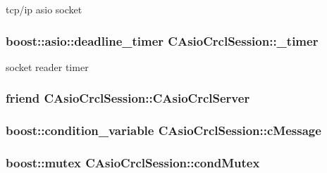tcp/ip asio socket \hypertarget{classCAsioCrclSession_a98a3308f0d6e8dd4c24d85fcc11ce87d}{
\subsubsection[{\-\_\-timer}]{\setlength{\rightskip}{0pt plus 5cm}boost\-::asio\-::deadline\-\_\-timer C\-Asio\-Crcl\-Session\-::\-\_\-timer\hspace{0.3cm}{\ttfamily [protected]}}}\label{classCAsioCrclSession_a98a3308f0d6e8dd4c24d85fcc11ce87d}
socket reader timer \hypertarget{classCAsioCrclSession_a9e3323a53591358adfce25ddf9ae580f}{
\subsubsection[{C\-Asio\-Crcl\-Server}]{\setlength{\rightskip}{0pt plus 5cm}friend C\-Asio\-Crcl\-Session\-::\-C\-Asio\-Crcl\-Server\hspace{0.3cm}{\ttfamily [protected]}}}\label{classCAsioCrclSession_a9e3323a53591358adfce25ddf9ae580f}
\hypertarget{classCAsioCrclSession_ac3008f28bb46669c7c4693dc49c9c183}{
\subsubsection[{c\-Message}]{\setlength{\rightskip}{0pt plus 5cm}boost\-::condition\-\_\-variable C\-Asio\-Crcl\-Session\-::c\-Message\hspace{0.3cm}{\ttfamily [protected]}}}\label{classCAsioCrclSession_ac3008f28bb46669c7c4693dc49c9c183}
\hypertarget{classCAsioCrclSession_a6c8fdf25cfe9645eb0e3d0b9e56c6e07}{
\subsubsection[{cond\-Mutex}]{\setlength{\rightskip}{0pt plus 5cm}boost\-::mutex C\-Asio\-Crcl\-Session\-::cond\-Mutex\hspace{0.3cm}{\ttfamily [protected]}}}\label{classCAsioCrclSession_a6c8fdf25cfe9645eb0e3d0b9e56c6e07}
